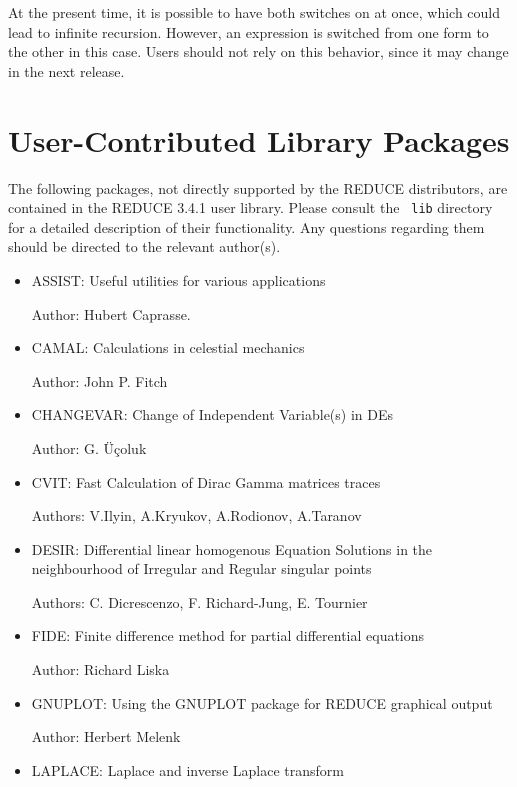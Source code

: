 At the present time, it is possible to have both switches on at once,
which could lead to infinite recursion.  However, an expression is
switched from one form to the other in this case.  Users should not rely
on this behavior, since it may change in the next release.

\section{User-Contributed Library Packages}

The following packages, not directly supported by the REDUCE distributors,
are contained in the REDUCE 3.4.1 user library.  Please consult the {\tt
lib} directory for a detailed description of their functionality.  Any
questions regarding them should be directed to the relevant author(s).
\begin{itemize}

\item{ASSIST: Useful utilities for various applications} 

Author: Hubert Caprasse.

\item{CAMAL: Calculations in celestial mechanics}

Author: John P. Fitch

\item{CHANGEVAR:  Change of Independent Variable(s) in DEs}

Author: G. \"{U}\c{c}oluk

\item{CVIT: Fast Calculation of Dirac Gamma matrices traces}

Authors: V.Ilyin, A.Kryukov, A.Rodionov, A.Taranov

\item{DESIR: Differential linear homogenous Equation Solutions in the
              neighbourhood of Irregular and Regular singular points}

Authors: C. Dicrescenzo, F. Richard-Jung, E. Tournier

\item{FIDE: Finite difference method for partial differential equations}

Author: Richard Liska

\item{GNUPLOT: Using the GNUPLOT package for REDUCE graphical output}

Author: Herbert Melenk

\item{LAPLACE: Laplace and inverse Laplace transform}


\end{itemize}
